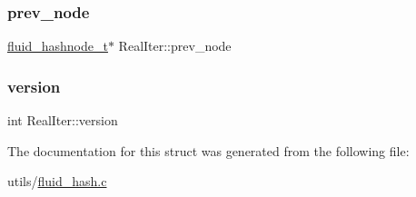 \subsubsection{\texorpdfstring{prev\+\_\+node}{prev\_node}}
{\footnotesize\ttfamily \hyperlink{fluid__hash_8h_a050a9781c9fa10e4b1caac67d32b9be4}{fluid\+\_\+hashnode\+\_\+t}$\ast$ Real\+Iter\+::prev\+\_\+node}

\mbox{\label{structRealIter_a78f441c77ed876e50454c192790b283c}} 
\subsubsection{\texorpdfstring{version}{version}}
{\footnotesize\ttfamily int Real\+Iter\+::version}



The documentation for this struct was generated from the following file\+:\begin{DoxyCompactItemize}
\item 
utils/\hyperlink{fluid__hash_8c}{fluid\+\_\+hash.\+c}\end{DoxyCompactItemize}
